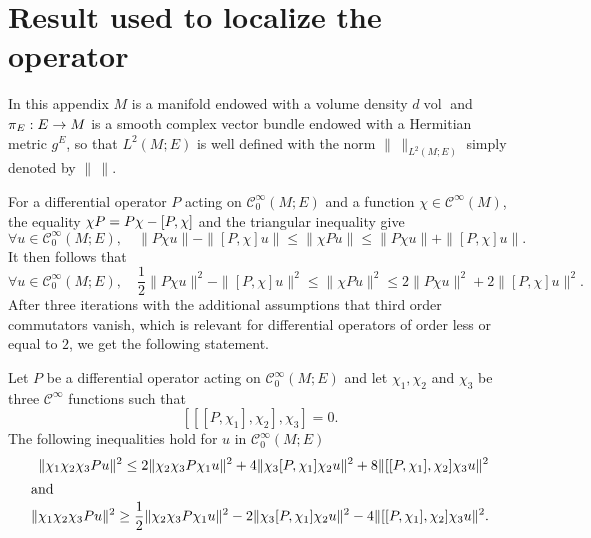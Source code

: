\documentclass[10pt]{amsart}
\theoremstyle{definition}\newtheorem{defi}[theo]{Definition}\newtheorem{rema}[theo]{Remark}\newtheorem{exam}[theo]{Example}\newtheorem{exem}[theo]{Example}\newtheorem{nota}[theo]{Notation}
\newcommand{\clC}{\mathcal{C}}
\DeclareMathOperator{\voll}{vol}
\let\oldforall\forall
\renewcommand*{\forall}{\mathrel{\oldforall}}
\let\originalleft\left
\let\originalright\right
\renewcommand{\left}{\mathopen{}\mathclose\bgroup\originalleft}
\renewcommand{\right}{\aftergroup\egroup\originalright}
\renewcommand*{\to}{\mathchoice{\longrightarrow}{\rightarrow}{\rightarrow}{\rightarrow}}
\begin{document}
\section{Result used to localize the operator}

In this appendix $M$ is a manifold endowed with a volume density $d\voll$ and $\pi_{E}:E\to M$ is a smooth complex vector bundle endowed with a Hermitian metric $g^{E}$, so that $L^{2}(M;E)$ is well defined with the norm $\|\,\|_{L^{2}(M;E)}$ simply denoted by $\|\,\|$.

For a differential operator $P$ acting on $\clC^{\infty}_{0}(M;E)$ and a function $\chi\in \clC^{\infty}(M)$, the equality $\chi P= P\chi -\left[P,\chi\right]$ and the triangular inequality give
\[
\forall u \in \clC^{\infty}_{0}(M;E),\quad \|P\chi u \| - \|[P,\chi]u\| \leq \| \chi Pu \| \leq \|P \chi u \| + \|[P,\chi] u\|.
\]
It then follows that
\[
\forall u \in \clC^{\infty}_{0}(M;E),\quad \frac{1}{2}\|P\chi u\|^{2} - \|[P,\chi]u\|^{2} \leq \|\chi P u\|^{2} \leq 2\|P \chi u\|^{2} + 2\|[P,\chi]u\|^{2}.
\]
After three iterations with the additional assumptions that third order commutators vanish, which is relevant for differential operators of order less or equal to $2$, we get the following statement.
\begin{prop}
Let $P$ be a differential operator acting on $\clC^{\infty}_{0}(M;E)$ and let $\chi_{1},\chi_{2}$ and $\chi_{3}$ be three $\clC^{\infty}$ functions such that
\begin{equation}\label{eq:Cond3com}
[[[P,\chi_{1}],\chi_{2}],\chi_{3}]=0.
\end{equation}
The following inequalities hold for $u$ in $\clC^{\infty}_{0}(M;E)$
\begin{align*}
\|\chi_{1}\chi_{2}\chi_{3} Pu \|^{2} \leq 2\|\chi_{2}\chi_{3}P\chi_{1}u \|^{2} + 4 \|\chi_{3}[P,\chi_{1}]\chi_{2}u \|^{2}+8 \|[[P,\chi_{1}],\chi_{2}]\chi_{3} u \|^{2}
\\
\intertext{and}
\|\chi_{1}\chi_{2}\chi_{3} Pu \|^{2} \geq \frac{1}{2}\|\chi_{2}\chi_{3}P\chi_{1}u \|^{2} - 2 \|\chi_{3}[P,\chi_{1}]\chi_{2}u \|^{2} -4 \|[[P,\chi_{1}],\chi_{2}]\chi_{3} u \|^{2}.
\end{align*}
\end{prop}
\end{document}
